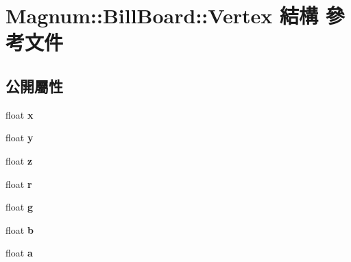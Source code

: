 \hypertarget{struct_magnum_1_1_bill_board_1_1_vertex}{}\section{Magnum\+:\+:Bill\+Board\+:\+:Vertex 結構 參考文件}
\label{struct_magnum_1_1_bill_board_1_1_vertex}
\subsection*{公開屬性}
\begin{DoxyCompactItemize}
\item 
float {\bfseries x}\hypertarget{struct_magnum_1_1_bill_board_1_1_vertex_a67aaf72c6b0208b780d99109bae63ffb}{}\label{struct_magnum_1_1_bill_board_1_1_vertex_a67aaf72c6b0208b780d99109bae63ffb}

\item 
float {\bfseries y}\hypertarget{struct_magnum_1_1_bill_board_1_1_vertex_ad581b1f72315d62ba2408e94bc734e43}{}\label{struct_magnum_1_1_bill_board_1_1_vertex_ad581b1f72315d62ba2408e94bc734e43}

\item 
float {\bfseries z}\hypertarget{struct_magnum_1_1_bill_board_1_1_vertex_a5b3c65947b296380899c9c5462ca16f3}{}\label{struct_magnum_1_1_bill_board_1_1_vertex_a5b3c65947b296380899c9c5462ca16f3}

\item 
float {\bfseries r}\hypertarget{struct_magnum_1_1_bill_board_1_1_vertex_a121cd10bae46a22429f856a85bbce180}{}\label{struct_magnum_1_1_bill_board_1_1_vertex_a121cd10bae46a22429f856a85bbce180}

\item 
float {\bfseries g}\hypertarget{struct_magnum_1_1_bill_board_1_1_vertex_a9adae7aac7ae04df49bae45b7ec29d42}{}\label{struct_magnum_1_1_bill_board_1_1_vertex_a9adae7aac7ae04df49bae45b7ec29d42}

\item 
float {\bfseries b}\hypertarget{struct_magnum_1_1_bill_board_1_1_vertex_a0319b6c46a0538b4274480ce6ae2d6e8}{}\label{struct_magnum_1_1_bill_board_1_1_vertex_a0319b6c46a0538b4274480ce6ae2d6e8}

\item 
float {\bfseries a}\hypertarget{struct_magnum_1_1_bill_board_1_1_vertex_a897e232497fa24d9f36b7f1b63519154}{}\label{struct_magnum_1_1_bill_board_1_1_vertex_a897e232497fa24d9f36b7f1b63519154}


\end{DoxyCompactItemize}
